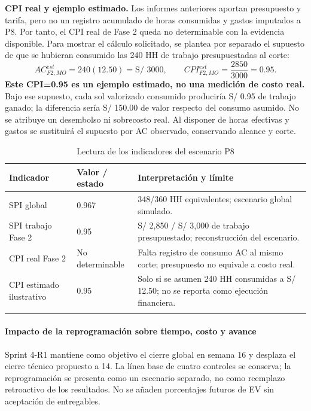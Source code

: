 \textbf{CPI real y ejemplo estimado.} Los informes anteriores aportan presupuesto y tarifa, pero no un registro acumulado de horas consumidas y gastos imputados a P8. Por tanto, el CPI real de Fase 2 queda no determinable con la evidencia disponible. Para mostrar el cálculo solicitado, se plantea por separado el supuesto de que se hubieran consumido las 240 HH de trabajo presupuestadas al corte:
\[
AC^{est}_{F2,MO}=240(12.50)=\text{S/ }3000,\qquad
CPI^{est}_{F2,MO}=\frac{2850}{3000}=0.95.
\]
\textbf{Este CPI=0.95 es un ejemplo estimado, no una medición de costo real.} Bajo ese supuesto, cada sol valorizado consumido produciría S/ 0.95 de trabajo ganado; la diferencia sería S/ 150.00 de valor respecto del consumo asumido. No se atribuye un desembolso ni sobrecosto real. Al disponer de horas efectivas y gastos se sustituirá el supuesto por AC observado, conservando alcance y corte.
\begin{table}[H]
\centering\small{}
\caption{Lectura de los indicadores del escenario P8}
\begin{tabularx}{\textwidth}{P{3cm}YY}
\toprule
\textbf{Indicador} & \textbf{Valor / estado} & \textbf{Interpretación y límite} \\
\midrule
SPI global & 0.967 & 348/360 HH equivalentes; escenario global simulado. \\
\addlinespace
SPI trabajo Fase 2 & 0.95 & S/ 2,850 / S/ 3,000 de trabajo presupuestado; reconstrucción del escenario. \\
\addlinespace
CPI real Fase 2 & No determinable & Falta registro de consumo AC al mismo corte; presupuesto no equivale a costo real. \\
\addlinespace
CPI estimado ilustrativo & 0.95 & Solo si se asumen 240 HH consumidas a S/ 12.50; no se reporta como ejecución financiera. \\
\addlinespace
\bottomrule
\end{tabularx}
\end{table}
\paragraph*{Impacto de la reprogramación sobre tiempo, costo y avance}
Sprint 4-R1 mantiene como objetivo el cierre global en semana 16 y desplaza el cierre técnico propuesto a 14. La línea base de cuatro controles se conserva; la reprogramación se presenta como un escenario separado, no como reemplazo retroactivo de los resultados. No se añaden porcentajes futuros de EV sin aceptación de entregables.

